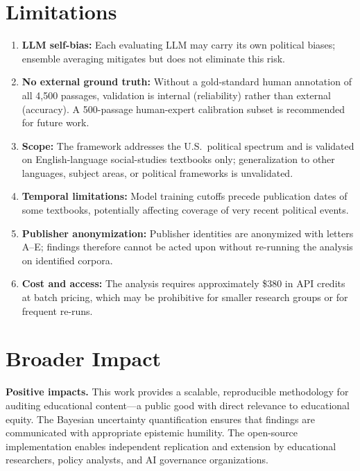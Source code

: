 \documentclass[10pt,letterpaper]{article}
\begin{document}
\section{Limitations}
\label{sec:limitations}

\begin{enumerate}
  \item \textbf{LLM self-bias:}  Each evaluating LLM may carry its own political
        biases; ensemble averaging mitigates but does not eliminate this risk.
  \item \textbf{No external ground truth:}  Without a gold-standard human
        annotation of all 4,500 passages, validation is internal (reliability)
        rather than external (accuracy).  A 500-passage human-expert calibration
        subset is recommended for future work.
  \item \textbf{Scope:}  The framework addresses the U.S.\ political spectrum and
        is validated on English-language social-studies textbooks only; generalization
        to other languages, subject areas, or political frameworks is unvalidated.
  \item \textbf{Temporal limitations:}  Model training cutoffs precede publication
        dates of some textbooks, potentially affecting coverage of very recent
        political events.
  \item \textbf{Publisher anonymization:}  Publisher identities are anonymized
        with letters A--E; findings therefore cannot be acted upon without
        re-running the analysis on identified corpora.
  \item \textbf{Cost and access:}  The analysis requires approximately \$380 in
        API credits at batch pricing, which may be prohibitive for smaller
        research groups or for frequent re-runs.
\end{enumerate}

\section{Broader Impact}
\label{sec:impact}

\textbf{Positive impacts.}  This work provides a scalable, reproducible
methodology for auditing educational content---a public good with direct
relevance to educational equity.  The Bayesian uncertainty quantification ensures
that findings are communicated with appropriate epistemic humility.  The
open-source implementation enables independent replication and extension by
educational researchers, policy analysts, and AI governance organizations.
\end{document}
